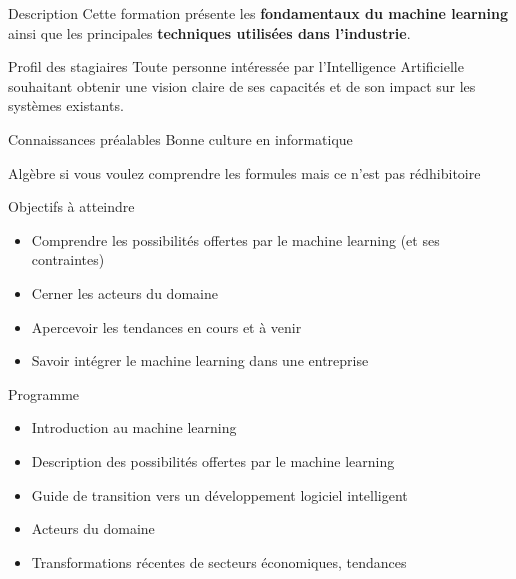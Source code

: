 \begin{frame}{Description}
  Cette formation présente les \textbf{fondamentaux du machine learning} ainsi que les principales \textbf{techniques utilisées dans l’industrie}.
\end{frame}

\begin{frame}{Profil des stagiaires}
  Toute personne intéressée par l'Intelligence Artificielle souhaitant obtenir une vision claire de ses capacités et de son impact sur les systèmes existants.
\end{frame}

\begin{frame}{Connaissances préalables}
  Bonne culture en informatique

  Algèbre si vous voulez comprendre les formules mais ce n'est pas rédhibitoire
\end{frame}

\begin{frame}{Objectifs à atteindre}
  \begin{itemize}
  \item Comprendre les possibilités offertes par le machine learning (et ses contraintes)
  \item Cerner les acteurs du domaine
  \item Apercevoir les tendances en cours et à venir
  \item Savoir intégrer le machine learning dans une entreprise
  \end{itemize}
\end{frame}

\begin{frame}{Programme}
  \begin{itemize}
  \item Introduction au machine learning
  \item Description des possibilités offertes par le machine learning 
  \item Guide de transition vers un développement logiciel intelligent
  \item Acteurs du domaine
  \item Transformations récentes de secteurs économiques, tendances
  \end{itemize}
\end{frame}
